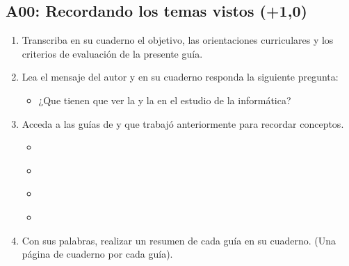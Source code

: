 \documentclass[letterpaper,10pt,spanish]{sphinxmanual}
\begin{document}
\subsection{A00: Recordando los temas vistos (+1,0)}
\label{\detokenize{1_guias/10informatica/G1002:a00-recordando-los-temas-vistos-1-0}}
\sphinxAtStartPar
{}
\begin{enumerate}
%
\item {} 
\sphinxAtStartPar
Transcriba en su cuaderno el objetivo, las orientaciones curriculares y los criterios de evaluación de la presente guía.

\item {} 
\sphinxAtStartPar
Lea el mensaje del autor y en su cuaderno responda la siguiente pregunta:
\begin{itemize}
\item {} 
\sphinxAtStartPar
¿Que tienen que ver la  y la  en el estudio de la informática?

\end{itemize}

\item {} 
\sphinxAtStartPar
Acceda a las guías de  y  que trabajó anteriormente para recordar conceptos.
\begin{itemize}
\item {} 
\sphinxAtStartPar
{\hyperref[\detokenize{1_guias/10ofimatica/G1011::doc}]{}}

\item {} 
\sphinxAtStartPar
{\hyperref[\detokenize{1_guias/10ofimatica/G1012::doc}]{}}

\item {} 
\sphinxAtStartPar
{\hyperref[\detokenize{1_guias/10programacion/G1021::doc}]{}}

\item {} 
\sphinxAtStartPar
{\hyperref[\detokenize{1_guias/10programacion/G1022::doc}]{}}

\end{itemize}

\item {} 
\sphinxAtStartPar
Con sus palabras, realizar un resumen de cada guía en su cuaderno. (Una página de cuaderno por cada guía).

\end{enumerate}
\end{document}
